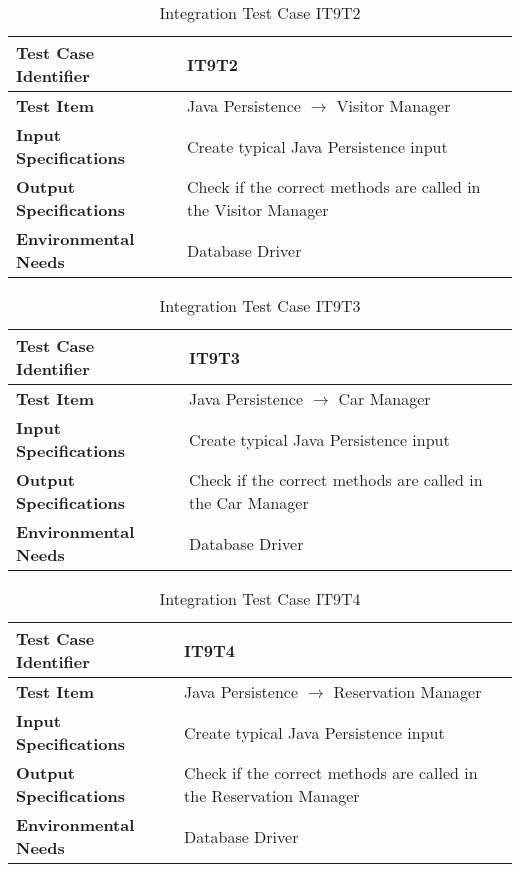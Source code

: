 \vspace{10pt}
\begin{table}[htbp]
\begin{center}
\renewcommand{\arraystretch}{1.5}
\begin{tabular}{l|p{}}
\hline
\textbf{Test Case Identifier} & IT9T2\\
\hline
\textbf{Test Item} & Java Persistence $\rightarrow$ Visitor Manager\\
\hline
\textbf{Input Specifications} & Create typical Java Persistence input \\
\hline
\textbf{Output Specifications} & Check if the correct methods are called in the Visitor Manager \\
\hline
\textbf{Environmental Needs} & Database Driver\\
\hline
\end{tabular}
\caption{Integration Test Case IT9T2}
\end{center}
\end{table}
\clearpage

\begin{table}[htbp]
\begin{center}
\renewcommand{\arraystretch}{1.5}
\begin{tabular}{l|p{}}
\hline
\textbf{Test Case Identifier} & IT9T3\\
\hline
\textbf{Test Item} & Java Persistence $\rightarrow$ Car Manager\\
\hline
\textbf{Input Specifications} & Create typical Java Persistence input \\
\hline
\textbf{Output Specifications} & Check if the correct methods are called in the Car Manager \\
\hline
\textbf{Environmental Needs} & Database Driver\\
\hline
\end{tabular}
\caption{Integration Test Case IT9T3}
\end{center}
\end{table}

\vspace{10pt}
\begin{table}[htbp]
\begin{center}
\renewcommand{\arraystretch}{1.5}
\begin{tabular}{l|p{}}
\hline
\textbf{Test Case Identifier} & IT9T4\\
\hline
\textbf{Test Item} & Java Persistence $\rightarrow$ Reservation Manager\\
\hline
\textbf{Input Specifications} & Create typical Java Persistence input \\
\hline
\textbf{Output Specifications} & Check if the correct methods are called in the Reservation Manager \\
\hline
\textbf{Environmental Needs} & Database Driver\\
\hline
\end{tabular}
\caption{Integration Test Case IT9T4}
\end{center}
\end{table}
\clearpage

